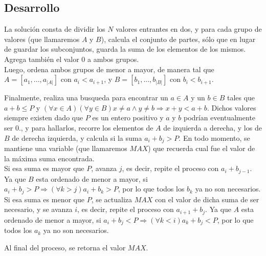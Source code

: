 \subsection{Desarrollo}
La solución consta de dividir los $N$ valores entrantes en dos, y para cada grupo de valores (que llamaremos $A$ y $B$), calcula el conjunto de partes, sólo que en lugar de guardar los subconjuntos, guarda la suma de los elementos de los mismos. Agrega también el valor $0$ a ambos grupos.\\
Luego, ordena ambos grupos de menor a mayor, de manera tal que $A = [a_{1},...,a_{\vert A\vert}]$ con $a_{i} < a_{i+1}$, y $B = [b_{1},...,b_{\vert B\vert}]$ con $b_{i} < b_{i+1}$.\par
Finalmente, realiza una busqueda para encontrar un $a \in A$ y un $b \in B$ tales que $a + b \leq P$ y $(\forall x \in A)(\forall y \in B) x \neq a \wedge y \neq b \Rightarrow x + y < a + b$. Dichos valores siempre existen dado que $P$ es un entero positivo y $a$ y $b$ podrían eventualmente ser $0$., y para hallarlos, recorre los elementos de $A$ de izquierda a derecha, y los de $B$ de derecha izquierda, y calcula si la suma $a_{i} + b_{j} > P$. En todo momento, se mantiene una variable (que llamaremos $MAX$) que recuerda cual fue el valor de la máxima suma encontrada.\\
Si esa suma es mayor que $P$, avanza $j$, es decir, repite el proceso con $a_{i} + b_{j-1}$. Ya que $B$ esta ordenado de menor a mayor, si $a_{i} + b_{j} > P \Rightarrow (\forall k > j) a_{i}+b_{k} > P$, por lo que todos los $b_{k}$ ya no son necesarios.\\
Si esa suma es menor que $P$, se actualiza $MAX$ con el valor de dicha suma de ser necesario, y se avanza $i$, es decir, repite el proceso con $a_{i+1} + b_{j}$. Ya que $A$ esta ordenado de menor a mayor, si $a_{i} + b_{j} < P \Rightarrow (\forall k < i) a_{k}+b_{j} < P$, por lo que todos los $a_{k}$ ya no son necesarios.\par
Al final del proceso, se retorna el valor $MAX$.
